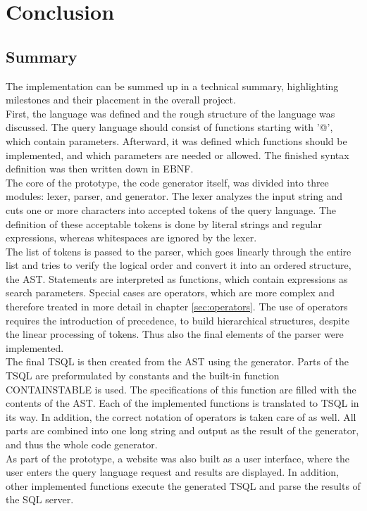 \newpage
\section{Conclusion}
\subsection{Summary}
The implementation can be summed up in a technical summary, highlighting milestones and their placement in the overall project.\\
First, the language was defined and the rough structure of the language was discussed. The query language should consist of functions starting with '@', which contain parameters. Afterward, it was defined which functions should be implemented, and which parameters are needed or allowed. The finished syntax definition was then written down in \ac{EBNF}.\\
The core of the prototype, the code generator itself, was divided into three modules: lexer, parser, and generator. The lexer analyzes the input string and cuts one or more characters into accepted tokens of the query language. The definition of these acceptable tokens is done by literal strings and regular expressions, whereas whitespaces are ignored by the lexer.\\
The list of tokens is passed to the parser, which goes linearly through the entire list and tries to verify the logical order and convert it into an ordered structure, the \ac{AST}. Statements are interpreted as functions, which contain expressions as search parameters. Special cases are operators, which are more complex and therefore treated in more detail in chapter \ref{sec:operators}. The use of operators requires the introduction of precedence, to build hierarchical structures, despite the linear processing of tokens. Thus also the final elements of the parser were implemented.\\
The final \ac{TSQL} is then created from the \ac{AST} using the generator. Parts of the \ac{TSQL} are preformulated by constants and the built-in function CONTAINSTABLE is used. The specifications of this function are filled with the contents of the \ac{AST}. Each of the implemented functions is translated to \ac{TSQL} in its way. In addition, the correct notation of operators is taken care of as well. All parts are combined into one long string and output as the result of the generator, and thus the whole code generator.\\
As part of the prototype, a website was also built as a user interface, where the user enters the query language request and results are displayed. In addition, other implemented functions execute the generated \ac{TSQL} and parse the results of the \ac{SQL} server.